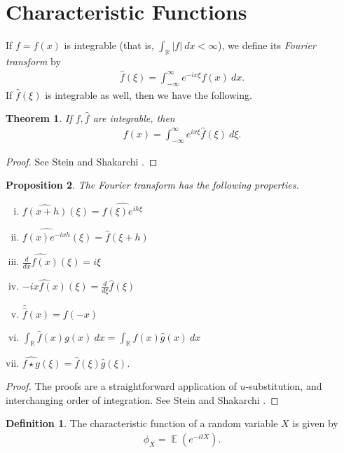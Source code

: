 \documentclass[12pt]{article}
\newcommand{\rr}{\mathbb{R}}
\newcommand{\wh}{\widehat}
\DeclareMathOperator{\ex}{\mathbb{E}}
\theoremstyle{plain}
\newtheorem{theorem}{Theorem}
\newtheorem{proposition}[theorem]{Proposition}
\theoremstyle{definition}
\newtheorem*{definition}{Definition}
\theoremstyle{remark}
\numberwithin{equation}{section}  %
\begin{document}
\section{Characteristic Functions}
If $f = f(x)$ is integrable (that is, $\int_{\rr}| f | \ dx < \infty$), we define its \emph{Fourier transform} by
\begin{equation*}
	\begin{split}
		\hat{f}(\xi) = \int_{-\infty}^{\infty} e^{-i x \xi} f(x) \ dx.
	\end{split}
\end{equation*}
If $ \hat{f}(\xi)$ is integrable as well, then we have the
following.
\begin{theorem}\label{thm:fourier-inversion}
	If $f, \hat{f}$ are integrable, then
	\begin{equation*}
		\begin{split}
			f(x) = \int_{-\infty}^{\infty} e^{i x \xi} \hat{f}(\xi) \ d \xi.
		\end{split}
	\end{equation*}
\end{theorem}
\begin{proof}
	See Stein and Shakarchi \cite{zbMATH02171466}.
\end{proof}
\begin{proposition}\label{prop:}
	The Fourier transform has the following properties.
	\begin{enumerate}[(i)]
		\item	$\wh{f(x+h)}(\xi) = \wh{f(\xi) e^{i h \xi}}$
		\item $\wh{f(x) e^{-i x h}}(\xi) = \wh{f}(\xi + h)$	
		\item $\wh{\frac{d}{dx} f(x)}(\xi) = i \xi$
		\item $\wh{-ix f(x)}(\xi) = \frac{d}{d \xi}\wh{f}(\xi)$
		\item $\hat{\hat{f}}(x) = f(-x)$
		\item $\int_{\rr} \wh{f}(x) g(x) \ dx = \int_{\rr} f(x) \wh{g}(x) \ dx$
		\item $\wh{f \star g}(\xi) = \wh{f}(\xi) \wh{g}(\xi)$.
	\end{enumerate}
\end{proposition}
\begin{proof}
	The proofs are a straightforward
	application of $u$-substitution, and interchanging order of integration.
	See Stein and Shakarchi \cite{zbMATH02171466}. 
\end{proof}
\begin{definition}
	The characteristic function of a random variable $X$ is given by
	\begin{equation*}
		\begin{split}
			\phi_{X} = \ex(e^{-itX}).
		\end{split}
	\end{equation*}
\end{definition}
\end{document}
